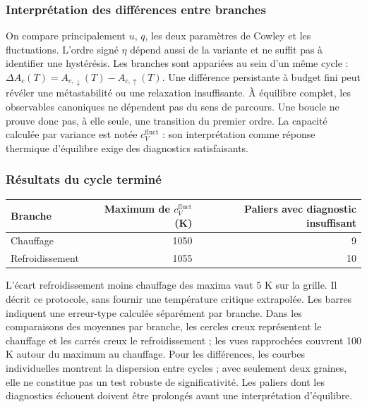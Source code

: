 \subsubsection{Interprétation des différences entre branches}
On compare principalement $u$, $q$, les deux paramètres de Cowley et les fluctuations. L'ordre signé $\eta$ dépend aussi de la variante et ne suffit pas à identifier une hystérésis. Les branches sont appariées au sein d'un même cycle : $\Delta A_c(T)=A_{c,\downarrow}(T)-A_{c,\uparrow}(T)$.
Une différence persistante à budget fini peut révéler une métastabilité ou une relaxation insuffisante. À équilibre complet, les observables canoniques ne dépendent pas du sens de parcours. Une boucle ne prouve donc pas, à elle seule, une transition du premier ordre. La capacité calculée par variance est notée $c_V^{\mathrm{fluct}}$ : son interprétation comme réponse thermique d'équilibre exige des diagnostics satisfaisants.
\subsubsection{Résultats du cycle terminé}
\begin{center}\small\begin{tabular}{lrr}\toprule
Branche & Maximum de $c_V^{\mathrm{fluct}}$ (K) & Paliers avec diagnostic insuffisant\\\midrule
Chauffage & 1050 & 9\\
Refroidissement & 1055 & 10\\
\bottomrule\end{tabular}\end{center}
L'écart refroidissement moins chauffage des maxima vaut $5$ K sur la grille. Il décrit ce protocole, sans fournir une température critique extrapolée.
Les barres indiquent une erreur-type calculée séparément par branche. Dans les comparaisons des moyennes par branche, les cercles creux représentent le chauffage et les carrés creux le refroidissement ; les vues rapprochées couvrent 100 K autour du maximum au chauffage. Pour les différences, les courbes individuelles montrent la dispersion entre cycles ; avec seulement deux graines, elle ne constitue pas un test robuste de significativité. Les paliers dont les diagnostics échouent doivent être prolongés avant une interprétation d'équilibre.
